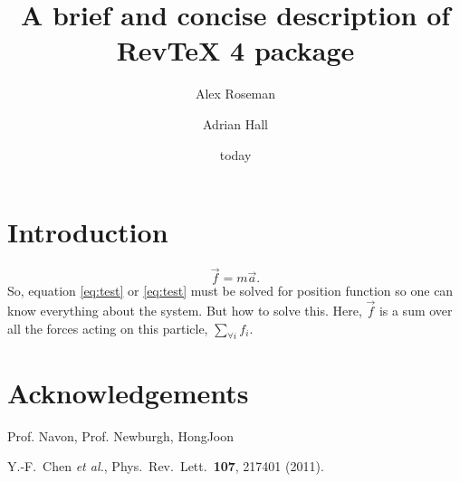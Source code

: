 \documentclass[letter,scriptaddress,twocolumn, prl]{revtex4}
\begin{document}
\title{A brief and concise description of RevTeX 4 package}

\author{Alex Roseman}
\author{Adrian Hall}
\date{today}

\begin{abstract}

\end{abstract}

\maketitle

\section{Introduction}

\begin{equation}
	\label{eq:test}
	\vec{f} = m \vec{a} .
\end{equation}
So, equation \eqref{eq:test} or \ref{eq:test} must be solved for position function so one can know everything about the system. But how to solve this. Here, $\vec{f}$ is a sum over all the forces acting on this particle, $\sum\limits_{\forall i} f_i$.



\section{Acknowledgements}
	Prof. Navon, Prof. Newburgh, HongJoon

% 
%

\begin{thebibliography}{}
	
	Y.-F.~Chen {\it et al.},
	Phys.\ Rev.\ Lett.\  {\bf 107}, 217401 (2011).
	
	
\end{thebibliography}
\end{document}
